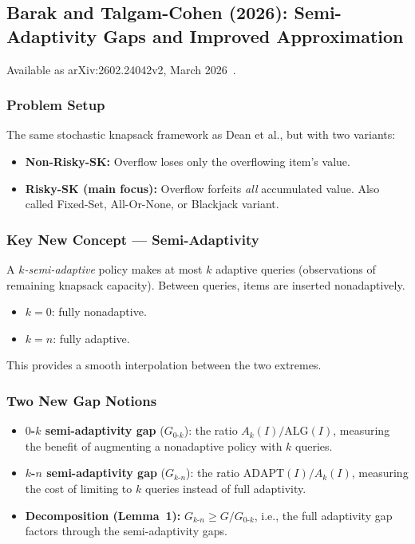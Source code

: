 \subsection{Barak and Talgam-Cohen (2026): Semi-Adaptivity Gaps and Improved Approximation}

Available as arXiv:2602.24042v2, March 2026~\cite{BarakTalgamCohen2026}.

\subsubsection{Problem Setup}

The same stochastic knapsack framework as Dean et al., but with two variants:
\begin{itemize}
    \item \textbf{Non-Risky-SK:} Overflow loses only the overflowing item's value.
    \item \textbf{Risky-SK (main focus):} Overflow forfeits \emph{all} accumulated value. Also called Fixed-Set, All-Or-None, or Blackjack variant.
\end{itemize}

\subsubsection{Key New Concept --- Semi-Adaptivity}

A \emph{$k$-semi-adaptive} policy makes at most $k$ adaptive queries (observations of remaining knapsack capacity). Between queries, items are inserted nonadaptively.
\begin{itemize}
    \item $k = 0$: fully nonadaptive.
    \item $k = n$: fully adaptive.
\end{itemize}
This provides a smooth interpolation between the two extremes.

\subsubsection{Two New Gap Notions}

\begin{itemize}
    \item \textbf{$0$-$k$ semi-adaptivity gap} ($G_{0\text{-}k}$): the ratio $A_k(I) / \mathrm{ALG}(I)$, measuring the benefit of augmenting a nonadaptive policy with $k$ queries.
    \item \textbf{$k$-$n$ semi-adaptivity gap} ($G_{k\text{-}n}$): the ratio $\mathrm{ADAPT}(I) / A_k(I)$, measuring the cost of limiting to $k$ queries instead of full adaptivity.
    \item \textbf{Decomposition (Lemma~1):} $G_{k\text{-}n} \ge G / G_{0\text{-}k}$, i.e., the full adaptivity gap factors through the semi-adaptivity gaps.
\end{itemize}

